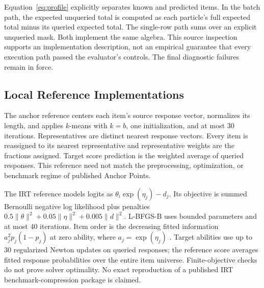 \documentclass{article}
\begin{document}
Equation~\ref{eq:profile} explicitly separates known and predicted items. In the batch path, the expected unqueried total is computed as each particle's full expected total minus its queried expected total. The single-row path sums over an explicit unqueried mask. Both implement the same algebra. This source inspection supports an implementation description, not an empirical guarantee that every execution path passed the evaluator's controls. The final diagnostic failures remain in force.

\subsection{Local Reference Implementations}
The anchor reference centers each item's source response vector, normalizes its length, and applies $k$-means with $k=b$, one initialization, and at most 30 iterations. Representatives are distinct nearest response vectors. Every item is reassigned to its nearest representative and representative weights are the fractions assigned. Target score prediction is the weighted average of queried responses. This reference need not match the preprocessing, optimization, or benchmark regime of published Anchor Points.

The IRT reference models logits as $\theta_i\exp(\eta_j)-d_j$. Its objective is summed Bernoulli negative log likelihood plus penalties $0.5\|\theta\|^2+0.05\|\eta\|^2+0.005\|d\|^2$. L-BFGS-B uses bounded parameters and at most 40 iterations. Item order is the decreasing fitted information $a_j^2 p_j(1-p_j)$ at zero ability, where $a_j=\exp(\eta_j)$ \citep[Chap.~6]{Baker2001}. Target abilities use up to 30 regularized Newton updates on queried responses; the reference score averages fitted response probabilities over the entire item universe. Finite-objective checks do not prove solver optimality. No exact reproduction of a published IRT benchmark-compression package is claimed.
\end{document}
